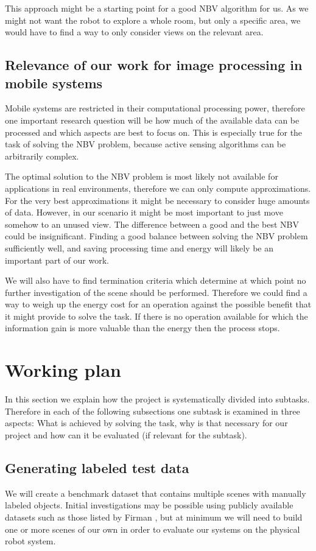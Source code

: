 \documentclass[a4paper,11pt,english]{article}
\begin{document}
This approach might be a starting point for a good NBV algorithm for us. As we might not want the robot to explore a whole room, but only a specific area, we would have to find a way to only consider views on the relevant area.

\subsection{Relevance of our work for image processing in mobile systems}\label{relevanceimageprocessing}
Mobile systems are restricted in their computational processing power, therefore one important research question will be how much of the available data can be processed and which aspects are best to focus on. 
This is especially true for the task of solving the NBV problem, because active sensing algorithms can be arbitrarily complex.

The optimal solution to the NBV problem is most likely not available for applications in real environments, therefore we can only compute approximations.
For the very best approximations it might be necessary to consider huge amounts of data.
However, in our scenario it might be most important to just move somehow to an unused view. The difference between a good and the best NBV could be insignificant.
Finding a good balance between solving the NBV problem sufficiently well, and saving processing time and energy will likely be an important part of our work.

We will also have to find termination criteria which determine at which point no further investigation of the scene should be performed.
Therefore we could find a way to weigh up the energy cost for an operation against the possible benefit that it might provide to solve the task.
If there is no operation available for which the information gain is more valuable than the energy then the process stops.

\section{Working plan}\label{workingplan}
In this section we explain how the project is systematically divided into subtasks.
Therefore in each of the following subsections one subtask is examined in three aspects: What is achieved by solving the task, why is that necessary for our project and how can it be evaluated (if relevant for the subtask).

\subsection{Generating labeled test data}\label{subtask-datageneration}
We will create a benchmark dataset that contains multiple scenes with manually labeled objects.
Initial investigations may be possible using publicly available datasets such as those listed by Firman \cite{firman2016}, but at minimum we will need to build one or more scenes of our own in order to evaluate our systems on the physical robot system.
\end{document}
